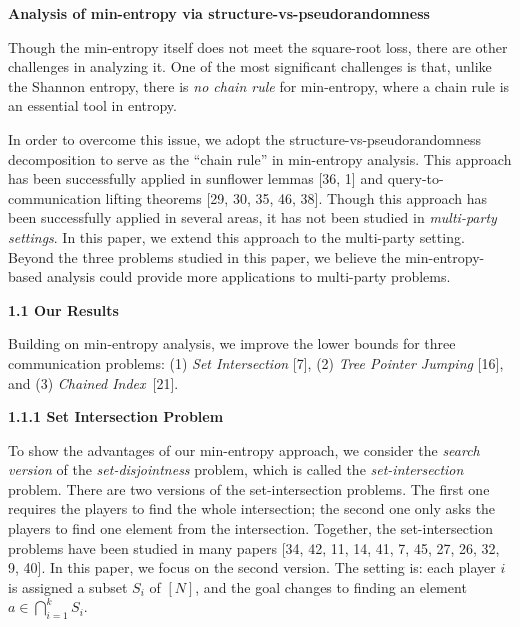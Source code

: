 \par\medskip\noindent\textbf{Analysis of min-entropy via structure-vs-pseudorandomness}\par




Though the min-entropy itself does not meet the square-root loss, there are other challenges in analyzing it. One of the most significant challenges is that, unlike the Shannon entropy, there is \emph{no chain rule} for min-entropy, where a chain rule is an essential tool in entropy.\par




In order to overcome this issue, we adopt the structure-vs-pseudorandomness decomposition to serve as the “chain rule” in min-entropy analysis. This approach has been successfully applied in sunflower lemmas [36, 1] and query-to-communication lifting theorems [29, 30, 35, 46, 38]. Though this approach has been successfully applied in several areas, it has not been studied in \emph{multi-party settings}.
In this paper, we extend this approach to the multi-party setting. Beyond the three problems studied in this paper, we believe the min-entropy-based analysis could provide more applications to multi-party problems.\par





\par\medskip\noindent\textbf{
1.1 Our Results}\par




Building on min-entropy analysis, we improve the lower bounds for three communication problems: (1) \emph{Set Intersection} [7], (2) \emph{Tree Pointer Jumping} [16],
and (3) \emph{Chained Index} [21].\par




\par\medskip\noindent\textbf{
1.1.1 Set Intersection Problem}\par




To show the advantages of our min-entropy approach, we consider the \emph{search version} of the \emph{set-disjointness} problem, which is called the \emph{set-intersection} problem. There are two versions of the set-intersection problems. The first one requires the players to find the whole intersection; the second one only asks the players to find one element from the intersection. Together, the set-intersection problems have been studied in many papers [34, 42, 11, 14, 41, 7, 45, 27, 26, 32, 9, 40]. In this paper, we focus on the second version. The setting is: each player $i$ is assigned a subset $S_{i}$ of $[N]$, and the goal changes to finding an element $a\in\bigcap_{i=1}^{k}S_{i}$.\par




